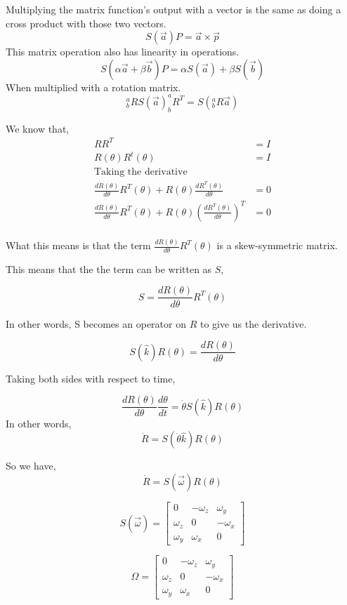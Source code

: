 \documentclass[11pt]{report}
\begin{document}
Multiplying the matrix function's output with a vector is the same as doing a cross product with those two vectors.
$$S (\vec{a}) P = \vec{a} \times \vec{p} $$
This matrix operation also has linearity in operations.
$$S (\alpha\vec{a} + \beta \vec{b}) P = \alpha S(\vec{a}) +  \beta S(\vec{b}) $$
When multiplied with a rotation matrix.
$$^a_bR S(\vec{a})^a_bR^T = S(^a_bR \vec{a})$$

We know that,
\begin{align*}
R R^T &= I \\
R(\theta) R^t(\theta) &= I \\
\text{Taking the derivative} \\
\frac{d R(\theta)}{d \theta} R^T(\theta) + R(\theta) \frac{d R^{T}(\theta)}{d \theta} &= 0 \\
\frac{d R(\theta)}{d \theta} R^T(\theta) + R(\theta) \left( \frac{d R^{T}(\theta)}{d \theta} \right)^{T}&= 0 \\
\end{align*}

What this means is that the term \(\frac{d R(\theta)}{d \theta} R^T (\theta)\) is a skew-symmetric matrix.

This means that the the term can be written as \(S\),

$$S = \frac{d R(\theta)}{d \theta} R^T (\theta)$$

In other words, S becomes an operator on \(R\) to give us the derivative.

$$S(\hat{k})R(\theta) = \frac{d R(\theta)}{d\theta}$$

Taking both sides with respect to time,

$$ \frac{d R(\theta)}{d \theta} \frac{d \theta}{dt} = \dot{\theta} S(\hat{k})R(\theta) $$
In other words,
$$\dot{R} = S(\dot{\theta}\hat{k})R(\theta)$$

So we have,
$$\dot{R} = S(\vec{\omega})R(\theta)$$

$$S(\vec{\omega}) = \begin{bmatrix}
0 & -\omega_z & \omega_y \\
\omega_z & 0 & -\omega_x \\
\omega_y & \omega_{x} & 0
\end{bmatrix}$$

$$\Omega = \begin{bmatrix}
0 & -\omega_z & \omega_y \\
\omega_z & 0 & -\omega_x \\
\omega_y & \omega_{x} & 0
\end{bmatrix}$$
\end{document}
